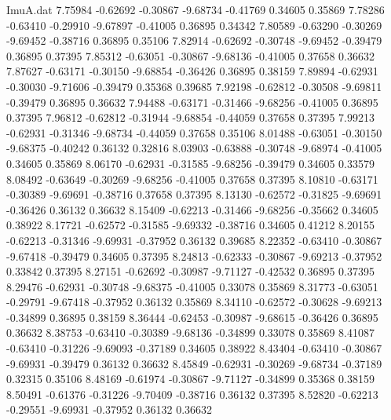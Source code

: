 \begin{filecontents}{ImuA.dat}
   7.75984   -0.62692   -0.30867   -9.68734   -0.41769    0.34605    0.35869
   7.78286   -0.63410   -0.29910   -9.67897   -0.41005    0.36895    0.34342
   7.80589   -0.63290   -0.30269   -9.69452   -0.38716    0.36895    0.35106
   7.82914   -0.62692   -0.30748   -9.69452   -0.39479    0.36895    0.37395
   7.85312   -0.63051   -0.30867   -9.68136   -0.41005    0.37658    0.36632
   7.87627   -0.63171   -0.30150   -9.68854   -0.36426    0.36895    0.38159
   7.89894   -0.62931   -0.30030   -9.71606   -0.39479    0.35368    0.39685
   7.92198   -0.62812   -0.30508   -9.69811   -0.39479    0.36895    0.36632
   7.94488   -0.63171   -0.31466   -9.68256   -0.41005    0.36895    0.37395
   7.96812   -0.62812   -0.31944   -9.68854   -0.44059    0.37658    0.37395
   7.99213   -0.62931   -0.31346   -9.68734   -0.44059    0.37658    0.35106
   8.01488   -0.63051   -0.30150   -9.68375   -0.40242    0.36132    0.32816
   8.03903   -0.63888   -0.30748   -9.68974   -0.41005    0.34605    0.35869
   8.06170   -0.62931   -0.31585   -9.68256   -0.39479    0.34605    0.33579
   8.08492   -0.63649   -0.30269   -9.68256   -0.41005    0.37658    0.37395
   8.10810   -0.63171   -0.30389   -9.69691   -0.38716    0.37658    0.37395
   8.13130   -0.62572   -0.31825   -9.69691   -0.36426    0.36132    0.36632
   8.15409   -0.62213   -0.31466   -9.68256   -0.35662    0.34605    0.38922
   8.17721   -0.62572   -0.31585   -9.69332   -0.38716    0.34605    0.41212
   8.20155   -0.62213   -0.31346   -9.69931   -0.37952    0.36132    0.39685
   8.22352   -0.63410   -0.30867   -9.67418   -0.39479    0.34605    0.37395
   8.24813   -0.62333   -0.30867   -9.69213   -0.37952    0.33842    0.37395
   8.27151   -0.62692   -0.30987   -9.71127   -0.42532    0.36895    0.37395
   8.29476   -0.62931   -0.30748   -9.68375   -0.41005    0.33078    0.35869
   8.31773   -0.63051   -0.29791   -9.67418   -0.37952    0.36132    0.35869
   8.34110   -0.62572   -0.30628   -9.69213   -0.34899    0.36895    0.38159
   8.36444   -0.62453   -0.30987   -9.68615   -0.36426    0.36895    0.36632
   8.38753   -0.63410   -0.30389   -9.68136   -0.34899    0.33078    0.35869
   8.41087   -0.63410   -0.31226   -9.69093   -0.37189    0.34605    0.38922
   8.43404   -0.63410   -0.30867   -9.69931   -0.39479    0.36132    0.36632
   8.45849   -0.62931   -0.30269   -9.68734   -0.37189    0.32315    0.35106
   8.48169   -0.61974   -0.30867   -9.71127   -0.34899    0.35368    0.38159
   8.50491   -0.61376   -0.31226   -9.70409   -0.38716    0.36132    0.37395
   8.52820   -0.62213   -0.29551   -9.69931   -0.37952    0.36132    0.36632

\end{filecontents}
